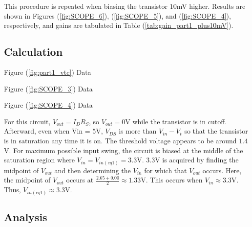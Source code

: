 This procedure is repeated when biasing the transistor $10$\si{\milli\volt} higher. Results are shown in Figures (\ref{fig:SCOPE_6}), (\ref{fig:SCOPE_5}), and (\ref{fig:SCOPE_4}), respectively, and gains are tabulated in Table (\ref{tab:gain_part1_plus10mV}).

\subsection{Calculation}

\FloatBarrier

\begin{table}[h!]
	\centering
	\caption{Figure (\ref{fig:part1_vtc}) Data}
	\label{tab:part1_vtc}
\end{table}

\FloatBarrier

\begin{table}[h!]
	\centering
	\caption{Figure (\ref{fig:SCOPE_3}) Data}
	\label{tab:gain_part1}
\end{table}

\FloatBarrier

\begin{table}[h!]
	\centering
	\caption{Figure (\ref{fig:SCOPE_4}) Data}
	\label{tab:gain_part1_plus10mV}
\end{table}

\FloatBarrier

For this circuit, $V_{out} = I_{D}R_{S}$, so $V_{out} = 0$\si{\volt} while the transistor is in cutoff. Afterward, even when Vin = $5$\si{\volt}, $V_{DS}$ is more than $V_{in} - V_{t}$ so that the transistor is in saturation any time it is on.
The threshold voltage appears to be around $1.4$\si{\volt}.
For maximum possible input swing, the circuit is biased at the middle of the saturation region where $V_{in} = V_{in(eq1)} = 3.3$\si{\volt}.
$3.3$\si{\volt} is acquired by finding the midpoint of $V_{out}$ and then determining the $V_{in}$ for which that $V_{out}$ occurs.
Here, the midpoint of $V_{out}$ occurs at $\frac{2.65 + 0.00}{2} \approx 1.33$\si{\volt}.
This occurs when $V_{in} \approx 3.3$\si{\volt}.
Thus, $V_{in(eq1)} \approx 3.3$\si{\volt}.

\subsection{Analysis}

